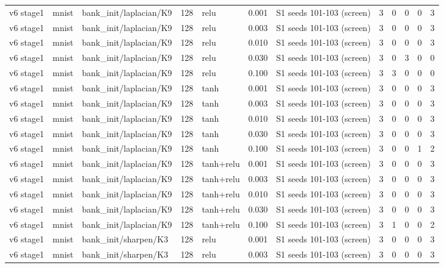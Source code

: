 \begin{table}[htbp]
{\begin{tabular}{@{}lllrlrlrrrrr@{}}
v6 stage1 & mnist & bank\_init/laplacian/K9 & 128 & relu & 0.001 & S1 seeds 101-103 (screen) & 3 & 0 & 0 & 0 & 3 \\
v6 stage1 & mnist & bank\_init/laplacian/K9 & 128 & relu & 0.003 & S1 seeds 101-103 (screen) & 3 & 0 & 0 & 0 & 3 \\
v6 stage1 & mnist & bank\_init/laplacian/K9 & 128 & relu & 0.010 & S1 seeds 101-103 (screen) & 3 & 0 & 0 & 0 & 3 \\
v6 stage1 & mnist & bank\_init/laplacian/K9 & 128 & relu & 0.030 & S1 seeds 101-103 (screen) & 3 & 0 & 3 & 0 & 0 \\
v6 stage1 & mnist & bank\_init/laplacian/K9 & 128 & relu & 0.100 & S1 seeds 101-103 (screen) & 3 & 3 & 0 & 0 & 0 \\
v6 stage1 & mnist & bank\_init/laplacian/K9 & 128 & tanh & 0.001 & S1 seeds 101-103 (screen) & 3 & 0 & 0 & 0 & 3 \\
v6 stage1 & mnist & bank\_init/laplacian/K9 & 128 & tanh & 0.003 & S1 seeds 101-103 (screen) & 3 & 0 & 0 & 0 & 3 \\
v6 stage1 & mnist & bank\_init/laplacian/K9 & 128 & tanh & 0.010 & S1 seeds 101-103 (screen) & 3 & 0 & 0 & 0 & 3 \\
v6 stage1 & mnist & bank\_init/laplacian/K9 & 128 & tanh & 0.030 & S1 seeds 101-103 (screen) & 3 & 0 & 0 & 0 & 3 \\
v6 stage1 & mnist & bank\_init/laplacian/K9 & 128 & tanh & 0.100 & S1 seeds 101-103 (screen) & 3 & 0 & 0 & 1 & 2 \\
v6 stage1 & mnist & bank\_init/laplacian/K9 & 128 & tanh+relu & 0.001 & S1 seeds 101-103 (screen) & 3 & 0 & 0 & 0 & 3 \\
v6 stage1 & mnist & bank\_init/laplacian/K9 & 128 & tanh+relu & 0.003 & S1 seeds 101-103 (screen) & 3 & 0 & 0 & 0 & 3 \\
v6 stage1 & mnist & bank\_init/laplacian/K9 & 128 & tanh+relu & 0.010 & S1 seeds 101-103 (screen) & 3 & 0 & 0 & 0 & 3 \\
v6 stage1 & mnist & bank\_init/laplacian/K9 & 128 & tanh+relu & 0.030 & S1 seeds 101-103 (screen) & 3 & 0 & 0 & 0 & 3 \\
v6 stage1 & mnist & bank\_init/laplacian/K9 & 128 & tanh+relu & 0.100 & S1 seeds 101-103 (screen) & 3 & 1 & 0 & 0 & 2 \\
v6 stage1 & mnist & bank\_init/sharpen/K3 & 128 & relu & 0.001 & S1 seeds 101-103 (screen) & 3 & 0 & 0 & 0 & 3 \\
v6 stage1 & mnist & bank\_init/sharpen/K3 & 128 & relu & 0.003 & S1 seeds 101-103 (screen) & 3 & 0 & 0 & 0 & 3 \\

\end{tabular}}
\end{table}
